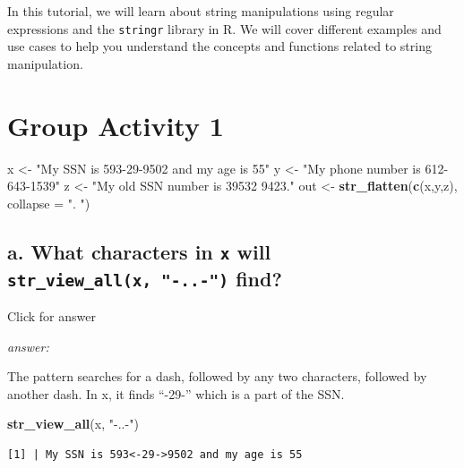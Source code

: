 \documentclass[
]{book}
\newenvironment{Shaded}{\begin{snugshade}}{\end{snugshade}}
\newcommand{\AttributeTok}[1]{\textcolor[rgb]{0.13,0.29,0.53}{#1}}
\newcommand{\FunctionTok}[1]{\textcolor[rgb]{0.13,0.29,0.53}{\textbf{#1}}}
\newcommand{\NormalTok}[1]{#1}
\newcommand{\OtherTok}[1]{\textcolor[rgb]{0.56,0.35,0.01}{#1}}
\newcommand{\StringTok}[1]{\textcolor[rgb]{0.31,0.60,0.02}{#1}}
\begin{document}
In this tutorial, we will learn about string manipulations using regular expressions and the \texttt{stringr} library in R. We will cover different examples and use cases to help you understand the concepts and functions related to string manipulation.

\hypertarget{group-activity-1}{%
\section{Group Activity 1}\label{group-activity-1}}

\begin{Shaded}
\begin{Highlighting}[]
\NormalTok{x }\OtherTok{\textless{}{-}} \StringTok{"My SSN is 593{-}29{-}9502 and my age is 55"}
\NormalTok{y }\OtherTok{\textless{}{-}} \StringTok{"My phone number is 612{-}643{-}1539"}
\NormalTok{z }\OtherTok{\textless{}{-}} \StringTok{"My old SSN number is 39532 9423."}
\NormalTok{out }\OtherTok{\textless{}{-}} \FunctionTok{str\_flatten}\NormalTok{(}\FunctionTok{c}\NormalTok{(x,y,z), }\AttributeTok{collapse =} \StringTok{". "}\NormalTok{)}
\end{Highlighting}
\end{Shaded}

\hypertarget{a.-what-characters-in-x-will-str_view_allx--..--find}{%
\subsection{\texorpdfstring{a. What characters in \texttt{x} will \texttt{str\_view\_all(x,\ "-..-")} find?}{a. What characters in x will str\_view\_all(x, "-..-") find?}}\label{a.-what-characters-in-x-will-str_view_allx--..--find}}

Click for answer

\emph{answer:}

The pattern searches for a dash, followed by any two characters, followed by another dash. In x, it finds ``-29-'' which is a part of the SSN.

\begin{Shaded}
\begin{Highlighting}[]
\FunctionTok{str\_view\_all}\NormalTok{(x, }\StringTok{"{-}..{-}"}\NormalTok{)}
\end{Highlighting}
\end{Shaded}

\begin{verbatim}
[1] | My SSN is 593<-29->9502 and my age is 55
\end{verbatim}
\end{document}
